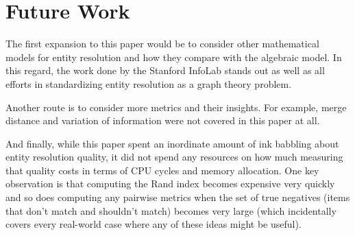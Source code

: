 \documentclass[lettersize,journal]{IEEEtran}
\begin{document}
    \section[future]{Future Work}\label{section:future}

    The first expansion to this paper would be to consider other mathematical
    models for entity resolution and how they compare with the algebraic model.
    In this regard, the work done by the Stanford InfoLab stands out as well as
    all efforts in standardizing entity resolution as a graph theory problem.

    Another route is to consider more metrics and their insights.
    For example, merge distance and variation of information were not covered in
    this paper at all.

    And finally, while this paper spent an inordinate amount of ink babbling
    about entity resolution quality, it did not spend any resources on how much
    measuring that quality costs in terms of CPU cycles and memory allocation.
    One key observation is that computing the Rand index becomes expensive very
    quickly and so does computing any pairwise metrics when the set of true
    negatives (items that don't match and shouldn't match) becomes very large
    (which incidentally covers every real-world case where any of these ideas
    might be useful).

    
\end{document}
